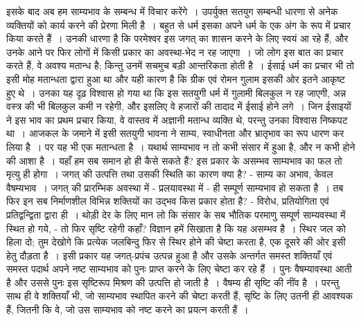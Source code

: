 इसके बाद अब हम साम्यभाव के सम्बन्ध में विचार करेंगे~। उपर्युक्त सतयुग सम्बन्धी धारणा से अनेक व्यक्तियों को कार्य करने की प्रेरणा मिली है~। बहुत से धर्म इसका अपने धर्म के एक अंग के रूप में प्रचार किया करते हैं~। उनकी धारणा है कि परमेश्वर इस जगत् का शासन करने के लिए स्वयं आ रहे हैं, और उनके आने पर फिर लोगों में किसी प्रकार का अवस्था-भेद न रह जाएगा~। जो लोग इस बात का प्रचार करते हैं, वे अवश्य मतान्ध है; किन्तु उनमें सचमुच बड़ी आन्तरिकता होती है~। ईसाई धर्म का प्रचार भी तो इसी मोह मतान्धता द्वारा हुआ था और यही कारण है कि ग्रीक एवं रोमन गुलाम इसकी ओर इतने आकृष्ट हुए थे~। उनका यह दृढ़ विश्वास हो गया था कि इस सतयुगी धर्म में गुलामी बिलकुल न रह जाएगी, अन्न वस्त्र की भी बिलकुल कमी न रहेगी, और इसलिए वे हजारों की तादाद में ईसाई होने लगे~। जिन ईसाइयों ने इस भाव का प्रथम प्रचार किया, वे वास्तव में अज्ञानी मतान्ध व्यक्ति थे, परन्तु उनका विश्वास निष्कपट था~। आजकल के जमाने में इसी सतयुगी भावना ने साम्य, स्वाधीनता और भ्रातृभाव का रूप धारण कर लिया है~। पर यह भी एक मतान्धता है~। यथार्थ साम्यभाव न तो कभी संसार में हुआ है, और न कभी होने की आशा है~। यहाँ हम सब समान हो ही कैसे सकते हैं? इस प्रकार के असम्भव साम्यभाव का फल तो मृत्यु ही होगा~। जगत् की उत्पत्ति तथा उसकी स्थिति का कारण क्या है? - साम्य का अभाव, केवल वैषम्यभाव~। जगत् की प्रारम्भिक अवस्था में - प्रलयावस्था में - ही सम्पूर्ण साम्यभाव हो सकता है~। तब फिर इन सब निर्माणशील विभिन्न शक्तियों का उद्भव किस प्रकार होता है? - विरोध, प्रतियोगिता एवं प्रतिद्वन्द्विता द्वारा ही~। थोड़ी देर के लिए मान लो कि संसार के सब भौतिक परमाणु सम्पूर्ण साम्यवस्था में स्थित हो गये, - तो फिर सृष्टि रहेगी कहाँ? विज्ञान हमें सिखाता है कि यह असम्भव है~। स्थिर जल को हिला दो; तुम देखोगे कि प्रत्येक जलबिन्दु फिर से स्थिर होने की चेष्टा करता है, एक दूसरे की ओर इसी हेतु दौड़ता है~। इसी प्रकार यह जगत्-प्रपंच उत्पन्न हुआ है और उसके अन्तर्गत समस्त शक्तियाँ एवं समस्त पदार्थ अपने नष्ट साम्यभाव को पुनः प्राप्त करने के लिए चेष्टा कर रहे हैं~। पुनः वैषम्यावस्था आती है और उससे पुनः इस सृष्टिरूप मिश्रण की उत्पत्ति हो जाती है~। वैषम्य ही सृष्टि की नींव है~। परन्तु साथ ही वे शक्तियाँ भी, जो साम्यभाव स्थापित करने की चेष्टा करती हैं, सृष्टि के लिए उतनी ही आवश्यक हैं, जितनी कि वे, जो उस साम्यभाव को नष्ट करने का प्रयत्न करती हैं~।

